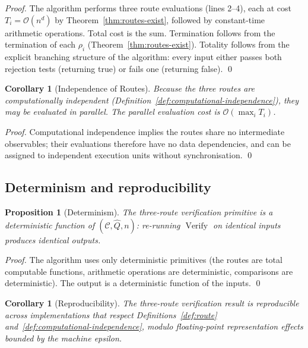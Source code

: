 \documentclass[twocolumn,11pt,a4paper]{article}
\newtheorem{corollary}[theorem]{Corollary}
\newtheorem{proposition}[theorem]{Proposition}
\DeclareMathOperator{\Verify}{Verify}
\newcommand{\Inv}{Q}
\newcommand{\Route}{\rho}
\newcommand{\Depth}{n}
\newcommand{\Dim}{d}
\begin{document}
\begin{proof}
The algorithm performs three route evaluations (lines 2--4), each at cost $T_i = \mathcal{O}(\Depth^{\Dim})$ by Theorem~\ref{thm:routes-exist}, followed by constant-time arithmetic operations. Total cost is the sum. Termination follows from the termination of each $\Route_i$ (Theorem~\ref{thm:routes-exist}). Totality follows from the explicit branching structure of the algorithm: every input either passes both rejection tests (returning true) or fails one (returning false). \qed
\end{proof}

\begin{corollary}[Independence of Routes]
\label{cor:independence-cost}
Because the three routes are computationally independent (Definition~\ref{def:computational-independence}), they may be evaluated in parallel. The parallel evaluation cost is $\mathcal{O}(\max_i T_i)$.
\end{corollary}

\begin{proof}
Computational independence implies the routes share no intermediate observables; their evaluations therefore have no data dependencies, and can be assigned to independent execution units without synchronisation. \qed
\end{proof}

\subsection{Determinism and reproducibility}

\begin{proposition}[Determinism]
\label{prop:determinism}
The three-route verification primitive is a deterministic function of $(\mathcal{C}, \hat\Inv, \Depth)$: re-running $\Verify$ on identical inputs produces identical outputs.
\end{proposition}

\begin{proof}
The algorithm uses only deterministic primitives (the routes are total computable functions, arithmetic operations are deterministic, comparisons are deterministic). The output is a deterministic function of the inputs. \qed
\end{proof}

\begin{corollary}[Reproducibility]
\label{cor:reproducibility}
The three-route verification result is reproducible across implementations that respect Definitions~\ref{def:route} and~\ref{def:computational-independence}, modulo floating-point representation effects bounded by the machine epsilon.
\end{corollary}
\end{document}
